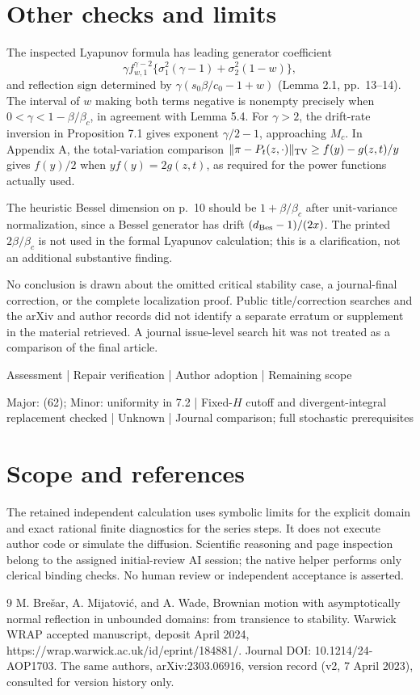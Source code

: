 \documentclass[10pt]{article}
\begin{document}
\section*{Other checks and limits}
The inspected Lyapunov formula has leading generator coefficient \[\gamma f_{w,1}^{\gamma-2}
 \{\sigma_1^2(\gamma-1)+\sigma_2^2(1-w)\},\] and reflection sign determined by \(\gamma(s_0\beta/c_0-1+w)\) (Lemma 2.1, pp. 13–14). The interval of \(w\) making both terms negative is nonempty precisely when \(0<\gamma<1-\beta/\beta_c\), in agreement with Lemma 5.4. For \(\gamma>2\), the drift-rate inversion in Proposition 7.1 gives exponent \(\gamma/2-1\), approaching \(M_c\). In Appendix A, the total-variation comparison \(\|\pi-P_t(z,\cdot)\|_{\rm TV}\ge f(y)-g(z,t)/y\) gives \(f(y)/2\) when \(yf(y)=2g(z,t)\), as required for the power functions actually used.\par
The heuristic Bessel dimension on p. 10 should be \(1+\beta/\beta_c\) after unit-variance normalization, since a Bessel generator has drift \((d_{\rm Bes}-1)/(2x)\). The printed \(2\beta/\beta_c\) is not used in the formal Lyapunov calculation; this is a clarification, not an additional substantive finding.\par
No conclusion is drawn about the omitted critical stability case, a journal-final correction, or the complete localization proof. Public title/correction searches and the arXiv and author records did not identify a separate erratum or supplement in the material retrieved. A journal issue-level search hit was not treated as a comparison of the final article.\par
Assessment | Repair verification | Author adoption | Remaining scope\par
Major: (62); Minor: uniformity in 7.2 | Fixed-\(H\) cutoff and divergent-integral replacement checked | Unknown | Journal comparison; full stochastic prerequisites\par
\section*{Scope and references}
The retained independent calculation uses symbolic limits for the explicit domain and exact rational finite diagnostics for the series steps. It does not execute author code or simulate the diffusion. Scientific reasoning and page inspection belong to the assigned initial-review AI session; the native helper performs only clerical binding checks. No human review or independent acceptance is asserted.\par
9 M. Brešar, A. Mijatović, and A. Wade, Brownian motion with asymptotically normal reflection in unbounded domains: from transience to stability. Warwick WRAP accepted manuscript, deposit April 2024, https://wrap.warwick.ac.uk/id/eprint/184881/. Journal DOI: 10.1214/24-AOP1703. The same authors, arXiv:2303.06916, version record (v2, 7 April 2023), consulted for version history only.\par
\end{document}
